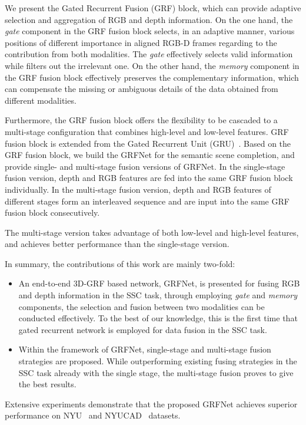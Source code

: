 \documentclass[10pt,twocolumn,letterpaper]{article}
\begin{document}
We present the Gated Recurrent Fusion (GRF) block, which can provide adaptive selection and aggregation of RGB and depth information. On the one hand, the \emph{gate} component in the GRF fusion block selects, in an adaptive manner, various positions of different importance in aligned RGB-D frames regarding to the contribution from both modalities.
The \emph{gate} effectively selects valid information while filters out the irrelevant one.
On the other hand, the
\emph{memory} component in the GRF fusion block effectively preserves the complementary information, which can compensate the missing or ambiguous details of the data obtained from different modalities. 

Furthermore, the GRF fusion block offers the flexibility to be cascaded to a multi-stage configuration that combines high-level and low-level features.
GRF fusion block is extended from the Gated Recurrent Unit (GRU)~\cite{cho2014learning}. 
Based on the GRF fusion block, we build the GRFNet for the semantic scene completion, and provide single- and multi-stage fusion versions of GRFNet. 
In the single-stage fusion version, depth and RGB features are fed into the same GRF fusion block individually. 
In the multi-stage fusion version, depth and RGB features of different stages form an interleaved sequence and are input into the same GRF fusion block consecutively. 

The multi-stage version takes advantage of both low-level and high-level features, and achieves better performance than the single-stage version.

In summary, the contributions of this work are mainly two-fold:
\vspace{-0.1cm}
\begin{itemize}
    \item
    An end-to-end 3D-GRF based network, GRFNet, is presented for fusing RGB and depth information in the SSC task,
    through employing \emph{gate} and \emph{memory} components, the selection and fusion between two modalities can be conducted effectively. 
    To the best of our knowledge, this is the first time that gated recurrent network is employed for data fusion in the SSC task.
    \vspace{-0.1cm}
    
    \item 
    Within the framework of GRFNet, single-stage and multi-stage fusion strategies are proposed. While outperforming existing fusing strategies in the SSC task already with the single stage, the multi-stage fusion proves to give the best results.
\end{itemize}
\vspace{-0.1cm}
Extensive experiments demonstrate that the proposed GRFNet achieves superior performance on NYU~\cite{silberman2012indoor} and NYUCAD~\cite{firman2016NYUCAD} datasets.
\end{document}
